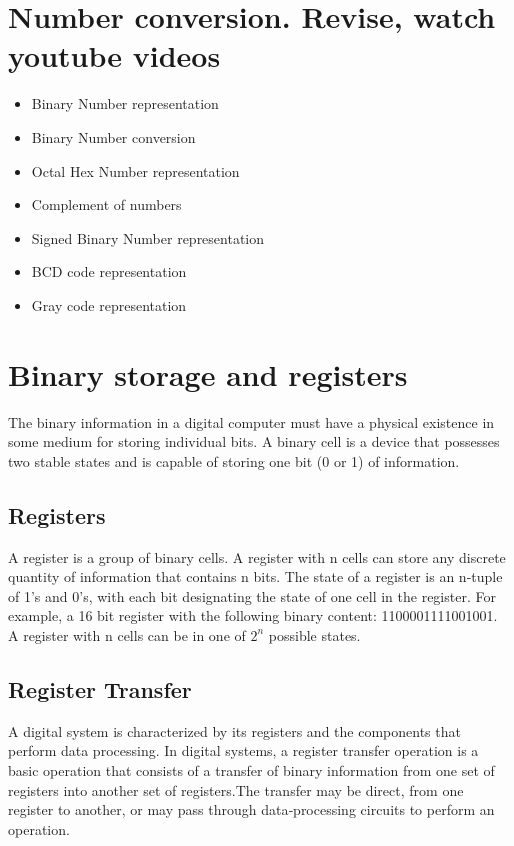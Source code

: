 \section{Number conversion. Revise, watch youtube videos}    
\begin{itemize}
    \item Binary Number representation
    \item Binary Number conversion
    \item Octal Hex Number representation        
    \item Complement of numbers
    \item Signed Binary Number representation
    \item BCD code representation
    \item Gray code representation
\end{itemize}

\section{Binary storage and registers}
The binary information in a digital computer must have a physical existence in some medium for storing individual bits. A binary cell is a device that possesses two stable states and is capable of storing one bit (0 or 1) of information.

\subsection{Registers} 
A register is a group of binary cells. A register with n cells can store any discrete quantity of information that contains n bits.  The state of a register is an n‐tuple of 1’s and 0’s, with each bit designating the state of one cell in the register. For example, a 16 bit register with the following binary content: 1100001111001001. A register with n cells can be in one of $2^{n}$ possible states.

\subsection{Register Transfer}
A digital system is characterized by its registers and the components that perform data processing. In digital systems, a register transfer operation is a basic operation that consists of a transfer of binary information from one set of registers into another set of registers.The transfer may be direct, from one register to another, or may pass through data‐processing circuits to perform an operation.



